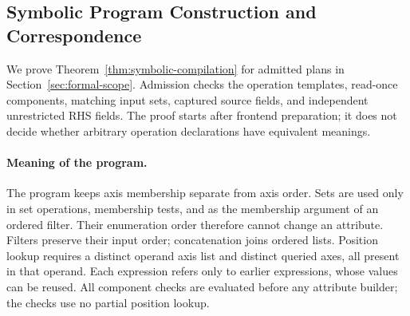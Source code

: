 \subsection{Symbolic Program Construction and Correspondence}
\label{app:symbolic-compilation-proof}
We prove Theorem~\ref{thm:symbolic-compilation} for admitted plans in
Section~\ref{sec:formal-scope}. Admission checks the operation templates,
read-once components, matching input sets, captured source fields, and
independent unrestricted RHS fields. The proof starts after frontend
preparation; it does not decide whether arbitrary operation declarations
have equivalent meanings.

\paragraph{Meaning of the program.}
The program keeps axis membership separate from axis order. Sets are used
only in set operations, membership tests, and as the membership argument
of an ordered filter. Their enumeration order therefore cannot change an
attribute. Filters preserve their input order; concatenation joins ordered
lists. Position lookup requires a distinct operand axis list and distinct
queried axes, all present in that operand. Each expression refers only to
earlier expressions, whose values can be reused. All component checks are
evaluated before any attribute builder; the checks use no partial position
lookup.

